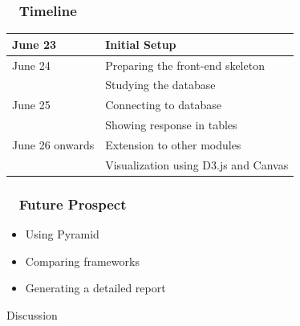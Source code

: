 \documentclass{beamer}
\begin{document}
\begin{frame}
\frametitle{ ~ Timeline}
\begin{center}
\begin{tabular}{|l|l|}
     \hline
     June 23 & Initial Setup\\
     \hline
     June 24 & Preparing the front-end skeleton\\
     \hline & Studying the database\\
     \hline
     June 25 & Connecting to database\\
     \hline & Showing response in tables\\
     \hline
     June 26 onwards & Extension to other modules\\
     \hline
     & Visualization using D3.js and Canvas\\
     \hline
     
\end{tabular}
\end{center}    
\end{frame}

\begin{frame}
\frametitle{ ~ Future Prospect} 
\begin{itemize}
\item{Using Pyramid}
\item{Comparing frameworks}
\item{Generating a detailed report}
\end{itemize}
\end{frame}



\begin{frame}
\begin{center}
\Huge{Discussion}
\end{center}
\end{frame}

\end{document}
